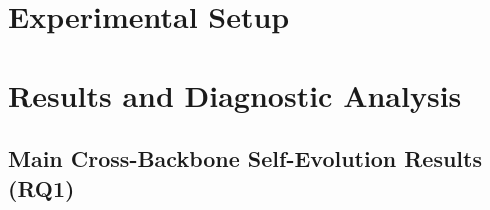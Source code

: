 \documentclass[11pt]{article}
\theoremstyle{definition}
\theoremstyle{remark}
\begin{document}
\section{Experimental Setup}
\label{sec:setup}






\section{Results and Diagnostic Analysis}
\label{sec:results}

\subsection{Main Cross-Backbone Self-Evolution Results (RQ1)}
\label{subsec:rq1_main}
\end{document}
